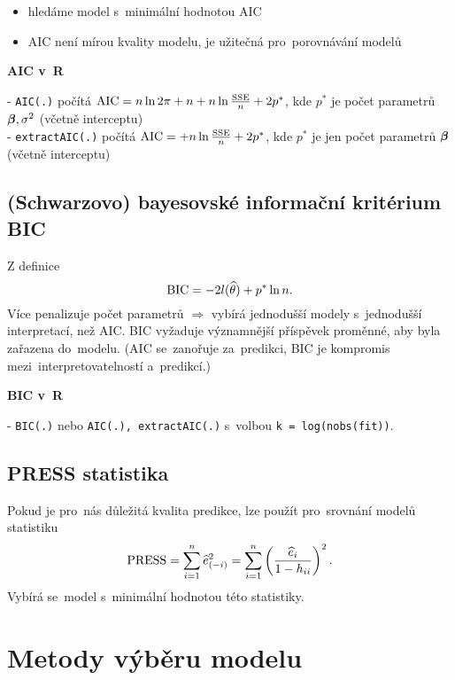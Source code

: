 \begin{remark}
\begin{itemize}
\item hledáme model s~minimální hodnotou AIC
\item AIC není mírou kvality modelu, je užitečná pro~porovnávání modelů
\end{itemize}
\end{remark}

\textbf{AIC v~R}

- \verb|AIC(.)| počítá $\mathrm{AIC} = n \ln 2 \pi + n + n \ln \frac{\mathrm{SSE}}{n} + 2p^*$, kde $p^*$ je počet parametrů $\boldsymbol{\beta}, \sigma^2$ (včetně interceptu) \\
- \verb|extractAIC(.)| počítá $\mathrm{AIC} = + n \ln \frac{\mathrm{SSE}}{n} + 2p^*$, kde $p^*$ je jen počet parametrů $\boldsymbol{\beta}$ (včetně interceptu)

\subsection{(Schwarzovo) bayesovské informační kritérium BIC}

Z definice
 $$
\mathrm{BIC} = -2 l(\widehat{\theta}) + p^* \ln n.
 $$
Více penalizuje počet parametrů $\Rightarrow$ vybírá jednodušší modely s~jednodušší interpretací, než AIC. BIC vyžaduje významnější příspěvek proměnné, aby byla zařazena do~modelu. (AIC se~zanořuje za~predikci, BIC je kompromis mezi~interpretovatelností a~predikcí.)

\textbf{BIC v~R}

- \verb|BIC(.)| nebo \verb|AIC(.), extractAIC(.)| s~volbou \verb|k = log(nobs(fit))|.

\subsection{PRESS statistika}

\newcommand{\PRESS}{\mathrm{PRESS}}

Pokud je pro~nás důležitá kvalita predikce, lze použít pro~srovnání modelů statistiku
 $$
\PRESS = \sumin \he_{(-i)}^2 = \sumin \left(\frac{\hei}{1 - \hii} \right)^2.
 $$
Vybírá se~model s~minimální hodnotou této statistiky.


\section{Metody výběru modelu}

